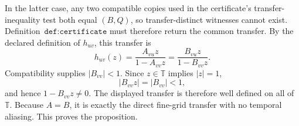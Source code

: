 In the latter case, any two compatible copies used in the certificate's transfer-inequality test both equal \((B,Q)\), so transfer-distinct witnesses cannot exist. Definition~\(\texttt{def:certificate}\) must therefore return the common transfer. By the declared definition of \(h_{uv}\), this transfer is
\[
h_{uv}(z)=\frac{A_{vu}z}{1-A_{vv}z}
          =\frac{B_{vu}z}{1-B_{vv}z}.
\]
Compatibility supplies \(|B_{vv}|<1\). Since \(z\in\mathbb T\) implies \(|z|=1\),
\[
|B_{vv}z|=|B_{vv}|<1,
\]
and hence \(1-B_{vv}z\ne0\). The displayed transfer is therefore well defined on all of \(\mathbb T\). Because \(A=B\), it is exactly the direct fine-grid transfer with no temporal aliasing. This proves the proposition.
